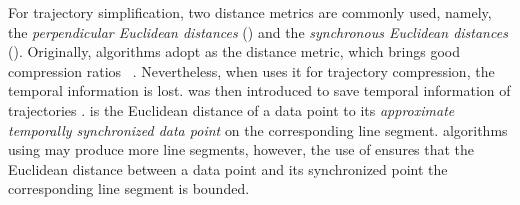 %
For trajectory simplification, two distance metrics are commonly used, namely, the \emph{perpendicular Euclidean distances} (\ped) and the \emph{synchronous Euclidean distances} (\sed).
Originally, \lsa algorithms adopt \ped as the distance metric, which brings good compression ratios~ \cite{Douglas:Peucker, Hershberger:Speeding, Liu:BQS, Muckell:Compression, Chen:Trajectory, Cao:Spatio, Shi:Survey}. Nevertheless, when uses it for trajectory compression, the temporal information is lost. 
%
\sed was then introduced to save temporal information of trajectories \cite{Meratnia:Spatiotemporal}. \sed is the Euclidean distance of a data point to its \emph{approximate temporally synchronized data point} \cite{Meratnia:Spatiotemporal} on the corresponding line segment. 
\lsa algorithms using \sed may produce more line segments, however, the use of \sed ensures that the Euclidean distance between a data point and its synchronized point \wrt the corresponding line segment is bounded. 


